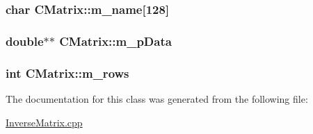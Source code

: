 \subsubsection[{\texorpdfstring{m\+\_\+name}{m_name}}]{\setlength{\rightskip}{0pt plus 5cm}char C\+Matrix\+::m\+\_\+name\mbox{[}128\mbox{]}\hspace{0.3cm}{\ttfamily [private]}}\hypertarget{classCMatrix_aecd316cc4360014e817f7dc763aaa957}{}\label{classCMatrix_aecd316cc4360014e817f7dc763aaa957}
\subsubsection[{\texorpdfstring{m\+\_\+p\+Data}{m_pData}}]{\setlength{\rightskip}{0pt plus 5cm}double$\ast$$\ast$ C\+Matrix\+::m\+\_\+p\+Data}\hypertarget{classCMatrix_ab0f18d68cad9b6d750d05a96b60a759d}{}\label{classCMatrix_ab0f18d68cad9b6d750d05a96b60a759d}
\subsubsection[{\texorpdfstring{m\+\_\+rows}{m_rows}}]{\setlength{\rightskip}{0pt plus 5cm}int C\+Matrix\+::m\+\_\+rows\hspace{0.3cm}{\ttfamily [private]}}\hypertarget{classCMatrix_ae23e5f8016ba06cfd1cce364a99f5037}{}\label{classCMatrix_ae23e5f8016ba06cfd1cce364a99f5037}


The documentation for this class was generated from the following file\+:\begin{DoxyCompactItemize}
\item 
\hyperlink{InverseMatrix_8cpp}{Inverse\+Matrix.\+cpp}\end{DoxyCompactItemize}
